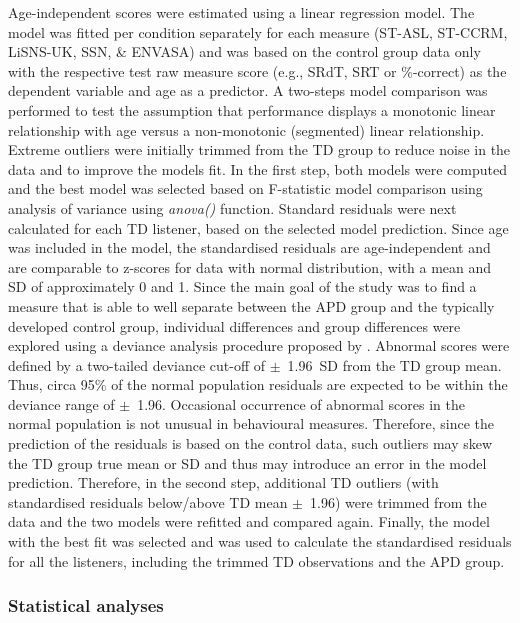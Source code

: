 \documentclass[a4paper, twoside]{templates/ociamthesis}
\begin{document}
Age-independent scores were estimated using a linear regression model. The model was fitted per condition separately for each measure (ST-ASL, ST-CCRM, LiSNS-UK, SSN, \& ENVASA) and was based on the control group data only with the respective test raw measure score (e.g., SRdT, SRT or \%-correct) as the dependent variable and age as a predictor. A two-steps model comparison was performed to test the assumption that performance displays a monotonic linear relationship with age versus a non-monotonic (segmented) linear relationship. Extreme outliers were initially trimmed from the TD group to reduce noise in the data and to improve the models fit. In the first step, both models were computed and the best model was selected based on F-statistic model comparison using analysis of variance using \emph{anova()} function. Standard residuals were next calculated for each TD listener, based on the selected model prediction. Since age was included in the model, the standardised residuals are age-independent and are comparable to z-scores for data with normal distribution, with a mean and SD of approximately 0 and 1. Since the main goal of the study was to find a measure that is able to well separate between the APD group and the typically developed control group, individual differences and group differences were explored using a deviance analysis procedure proposed by \textcite{Ramus2003}. Abnormal scores were defined by a two-tailed deviance cut-off of \(\pm\)~1.96~SD from the TD group mean. Thus, circa 95\% of the normal population residuals are expected to be within the deviance range of \(\pm\)~1.96. Occasional occurrence of abnormal scores in the normal population is not unusual in behavioural measures. Therefore, since the prediction of the residuals is based on the control data, such outliers may skew the TD group true mean or SD and thus may introduce an error in the model prediction. Therefore, in the second step, additional TD outliers (with standardised residuals below/above TD mean \(\pm\)~1.96) were trimmed from the data and the two models were refitted and compared again. Finally, the model with the best fit was selected and was used to calculate the standardised residuals for all the listeners, including the trimmed TD observations and the APD group.

\hypertarget{statistical-analyses}{%
\subsubsection*{Statistical analyses}\label{statistical-analyses}}
\end{document}
